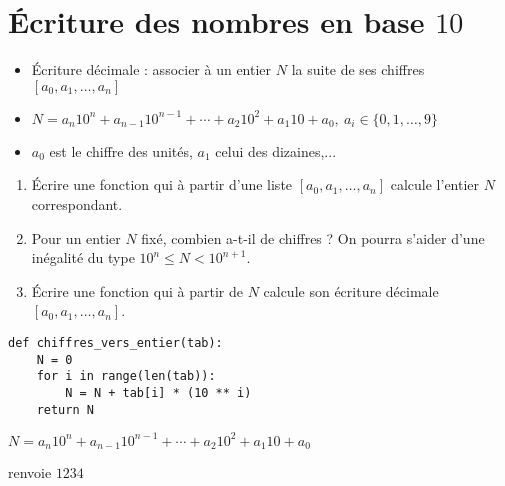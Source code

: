 \section{\'Ecriture des nombres en base $10$}

\begin{frame}
\begin{itemize}
  \item \'Ecriture décimale : associer à un entier $N$ la suite de ses chiffres $[a_0,a_1,\ldots,a_n]$
\pause  
  \item $N= a_n 10^n+ a_{n-1}10^{n-1}+\cdots + a_2 10^2 + a_1 10 + a_0, \ a_i \in \{0,1,\ldots,9\}$
\pause  
  \item $a_0$ est le chiffre des unités, $a_1$ celui des dizaines,...
\end{itemize}

\pause

\begin{tp}
\begin{enumerate}
  \item \'Ecrire une fonction qui à partir d'une liste $[a_0,a_1,\ldots,a_n]$ calcule l'entier $N$ correspondant.
  \item Pour un entier $N$ fixé, combien a-t-il de chiffres ? 
  On pourra s'aider d'une inégalité du type $10^n \le N < 10^{n+1}$.
  \item \'Ecrire une fonction qui à partir de $N$ calcule son écriture décimale $[a_0,a_1,\ldots,a_n]$.
\end{enumerate}
\end{tp}
\end{frame}


\begin{frame}[fragile]

\begin{algo}[decimale.py (1)]
\begin{lstlisting}
def chiffres_vers_entier(tab):
    N = 0
    for i in range(len(tab)):
        N = N + tab[i] * (10 ** i)
    return N
\end{lstlisting}  
\end{algo}

\pause
\bigskip

\centerline{$N= a_n 10^n+ a_{n-1}10^{n-1}+\cdots + a_2 10^2 + a_1 10 + a_0$}

\pause
\bigskip

\centerline{ renvoie $1234$}

\end{frame}


